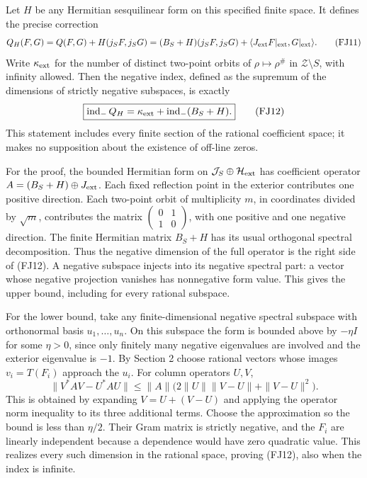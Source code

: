 \documentclass[
  10pt,
  a4paper,
]{article}
\begin{document}
Let \(H\) be any Hermitian sesquilinear form on this specified finite
space. It defines the precise correction \[
Q_H(F,G)=Q(F,G)+H(j_SF,j_SG)
 =(B_S+H)(j_SF,j_SG)
   +\langle J_{\rm ext}F|_{\rm ext},G|_{\rm ext}\rangle.
\tag{FJ11}
\] Write \(\kappa_{\rm ext}\) for the number of distinct two-point
orbits of \(\rho\mapsto\rho^\#\) in \(\mathcal Z\setminus S\), with
infinity allowed. Then the negative index, defined as the supremum of
the dimensions of strictly negative subspaces, is exactly \[
\boxed{\operatorname{ind}_-Q_H=
 \kappa_{\rm ext}+\operatorname{ind}_-(B_S+H).}
\tag{FJ12}
\] This statement includes every finite section of the rational
coefficient space; it makes no supposition about the existence of
off-line zeros.

For the proof, the bounded Hermitian form on
\(\mathcal J_S\oplus\mathcal H_{\rm ext}\) has coefficient operator
\(A=(B_S+H)\oplus J_{\rm ext}\). Each fixed reflection point in the
exterior contributes one positive direction. Each two-point orbit of
multiplicity \(m\), in coordinates divided by \(\sqrt m\), contributes
the matrix
\(\left(\begin{smallmatrix}0&1\\1&0\end{smallmatrix}\right)\), with one
positive and one negative direction. The finite Hermitian matrix
\(B_S+H\) has its usual orthogonal spectral decomposition. Thus the
negative dimension of the full operator is the right side of (FJ12). A
negative subspace injects into its negative spectral part: a vector
whose negative projection vanishes has nonnegative form value. This
gives the upper bound, including for every rational subspace.

For the lower bound, take any finite-dimensional negative spectral
subspace with orthonormal basis \(u_1,\ldots,u_n\). On this subspace the
form is bounded above by \(-\eta I\) for some \(\eta>0\), since only
finitely many negative eigenvalues are involved and the exterior
eigenvalue is \(-1\). By Section 2 choose rational vectors whose images
\(v_i=T(F_i)\) approach the \(u_i\). For column operators \(U,V\), \[
\|V^*AV-U^*AU\|
 \le\|A\|\bigl(2\|U\|\|V-U\|+\|V-U\|^2\bigr).
\tag{FJ13}
\] This is obtained by expanding \(V=U+(V-U)\) and applying the operator
norm inequality to its three additional terms. Choose the approximation
so the bound is less than \(\eta/2\). Their Gram matrix is strictly
negative, and the \(F_i\) are linearly independent because a dependence
would have zero quadratic value. This realizes every such dimension in
the rational space, proving (FJ12), also when the index is infinite.
\end{document}
